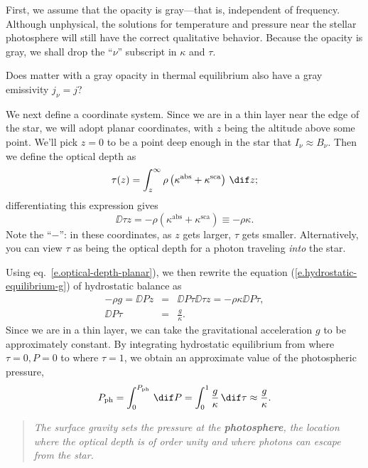 First, we assume that the opacity is gray---that is, independent of frequency. Although unphysical, the solutions for temperature and pressure near the stellar photosphere will still have the correct qualitative behavior. Because the opacity is gray, we shall drop the ``$\nu$'' subscript in $\kappa$ and $\tau$.

\begin{exercisebox}
Does matter with a gray opacity in thermal equilibrium also have a gray emissivity $j_{\nu}=j$?
\end{exercisebox}

We next define a coordinate system. Since we are in a thin layer near the edge of the star, we will adopt planar coordinates, with $z$ being the altitude above some point. We'll pick $z=0$ to be a point deep enough in the star that $I_{\nu}\approx B_{\nu}$. Then we define the optical depth as
\begin{equation}\label{e.optical-depth-planar}
	\tau(z) = \int_{z}^{\infty} \rho\left(\kappa^{\mathrm{abs}}+\kappa^{\mathrm{sca}}\right)\,\dif z ;
\end{equation}
differentiating this expression gives
\[
	\DD{\tau}{z} = -\rho\left(\kappa^{\mathrm{abs}}+\kappa^{\mathrm{sca}}\right) \equiv -\rho\kappa.
\]
Note the ``$-$'': in these coordinates, as $z$ gets larger, $\tau$ gets smaller. Alternatively, you can view $\tau$ as being the optical depth for a photon traveling \emph{into} the star.

Using eq.~\ref{e.optical-depth-planar}), we then rewrite the equation (\ref{e.hydrostatic-equilibrium-g}) of hydrostatic balance as
\begin{eqnarray}
	-\rho g = \DD{P}{z} &=& \DD{P}{\tau}\DD{\tau}{z} = -\rho\kappa\DD{P}{\tau},\nonumber\\
	\DD{P}{\tau} &=& \frac{g}{\kappa}.
\label{e.P-tau}
\end{eqnarray}
Since we are in a thin layer, we can take the gravitational acceleration $g$ to be approximately constant. By integrating hydrostatic equilibrium from where $\tau = 0, P = 0$ to where $\tau = 1$, we obtain an approximate value of the photospheric pressure,
\[
	P_{\mathrm{ph}} = \int_{0}^{P_{\mathrm{ph}}}\,\dif P = \int_{0}^{1}\frac{g}{\kappa}\,\dif\tau \approx \frac{g}{\kappa}.
\]
\begin{quote}
\emph{The surface gravity sets the pressure at the \textbf{photosphere}, the location where the optical depth is of order unity and where photons can escape from the star.}
\end{quote}


